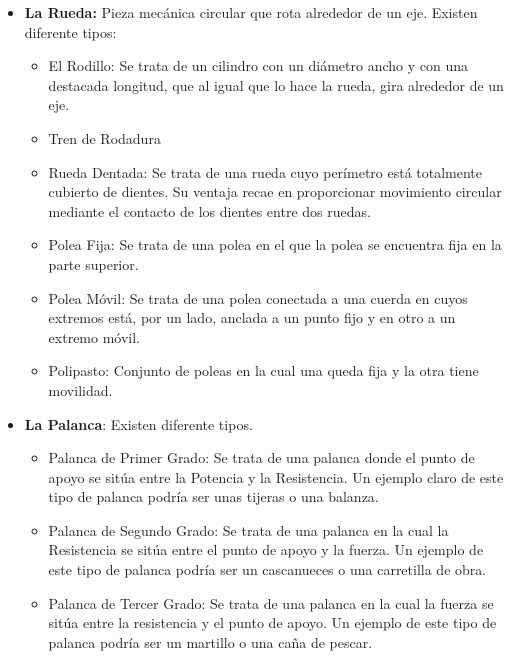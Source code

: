 \begin{itemize}

\item \textbf{La Rueda:} Pieza mecánica circular que rota alrededor de un eje. Existen diferente tipos:

\begin{itemize}
\item El Rodillo: Se trata de un cilindro con un diámetro ancho y con una destacada longitud, que al igual que lo hace la rueda, gira alrededor de un eje.

\item Tren de Rodadura
\item Rueda Dentada: Se trata de una rueda cuyo perímetro está totalmente cubierto de dientes. Su ventaja recae en proporcionar movimiento circular mediante el contacto de los dientes entre dos ruedas.

\item Polea Fija: Se trata de una polea en el que la polea se encuentra fija en la parte superior.

\item Polea Móvil: Se trata de una polea conectada a una cuerda en cuyos extremos está, por un lado, anclada a un punto fijo y en otro a un extremo móvil.

\item Polipasto: Conjunto de poleas en la cual una queda fija y la otra tiene movilidad.


\end{itemize}

\item \textbf{La Palanca}: Existen diferente tipos.

\begin{itemize}
\item Palanca de Primer Grado: Se trata de una palanca donde el punto de apoyo se sitúa entre la Potencia y la Resistencia. Un ejemplo claro de este tipo de palanca podría ser unas tijeras o una balanza.

\item Palanca de Segundo Grado: Se trata de una palanca en la cual la Resistencia se sitúa entre el punto de apoyo y la fuerza. Un ejemplo de este tipo de palanca podría ser un cascanueces o una carretilla de obra.

\item Palanca de Tercer Grado: Se trata de una palanca en la cual la fuerza se sitúa entre la resistencia y el punto de apoyo. Un ejemplo de este tipo de palanca podría ser un martillo o una caña de pescar.


\end{itemize}
\end{itemize}
